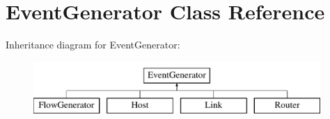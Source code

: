 \hypertarget{classEventGenerator}{\section{\-Event\-Generator \-Class \-Reference}
\label{classEventGenerator}
}
\-Inheritance diagram for \-Event\-Generator\-:\begin{figure}[H]
\begin{center}
\leavevmode
\includegraphics[height=2.000000cm]{classEventGenerator}
\end{center}
\end{figure}
